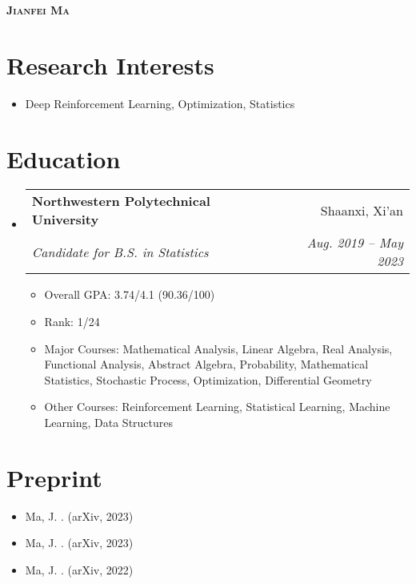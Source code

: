 \documentclass[letterpaper,11pt]{article}
\makeatletter
\newcommand{\resumeItem}[1]{
  \item\small{
    {#1 \vspace{-2pt}}
  }
}
\newcommand{\resumeSubheading}[4]{
  \vspace{-2pt}\item
    \begin{tabular*}{0.97\textwidth}[t]{l@{\extracolsep{\fill}}r}
      \textbf{#1} & #2 \\
      \textit{\small#3} & \textit{\small #4} \\
    \end{tabular*}\vspace{-7pt}
}
\newcommand{\resumeSubHeadingListStart}{\begin{itemize}[leftmargin=0.15in, label={}]}
\newcommand{\resumeSubHeadingListEnd}{\end{itemize}}
\newcommand{\resumeItemListStart}{\begin{itemize}}
\newcommand{\resumeItemListEnd}{\end{itemize}\vspace{-5pt}}
\makeatother
\begin{document}

\begin{center}
    \textbf{\Huge \scshape Jianfei Ma} \\ \vspace{1pt}
    \small{\item{
     {\href{mailto:matrixfeeney@gmail.com}{}}
    {\href{https://github.com/MagiFeeney}{}}     
     {\href{https://magifeeney.github.io}{}}       
    }}
\end{center}

\section{Research Interests}
  \resumeSubHeadingListStart
    \resumeItem
      {Deep Reinforcement Learning, Optimization, Statistics}%
  \resumeSubHeadingListEnd

\section{Education}
  \resumeSubHeadingListStart
    \resumeSubheading
      {Northwestern Polytechnical University}{Shaanxi, Xi'an}
      {Candidate for B.S. in Statistics}{Aug. 2019 -- May 2023}
    \resumeItemListStart
      \resumeItem
      {Overall GPA: 3.74/4.1 (90.36/100)}
     \resumeItem
      {Rank: 1/24}
     \resumeItem
      {Major Courses: Mathematical Analysis, Linear Algebra, Real Analysis, Functional Analysis, Abstract Algebra, Probability, Mathematical Statistics, Stochastic Process, Optimization, Differential Geometry}
      \resumeItem
      {Other Courses: Reinforcement Learning, Statistical Learning, Machine Learning, Data Structures}
    \resumeItemListEnd
  \resumeSubHeadingListEnd

\section{Preprint}
      \resumeItemListStart
        \resumeItem{Ma, J. \href{https://arxiv.org/abs/2302.00533}{\color{darkblue}{Distillation Policy Optimization}}. (arXiv, 2023)}
        \resumeItem{Ma, J. \href{https://arxiv.org/abs/2303.01240}{\color{darkblue}{The Point to Which Soft Actor-Critic Converges}}. (arXiv, 2023)}
        \resumeItem{Ma, J. \href{https://arxiv.org/abs/2208.09322v2}{\color{darkblue}{Entropy Augmented Reinforcement Learning}}. (arXiv, 2022)}
      \resumeItemListEnd
      
\end{document}
